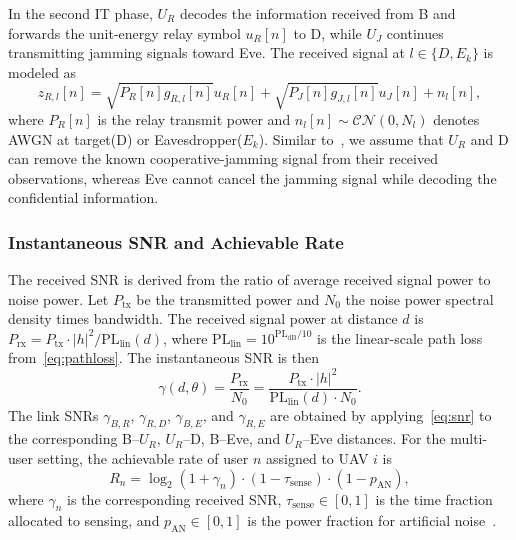 \documentclass[journal]{IEEEtran}
\begin{document}
In the second IT phase, $U_R$ decodes the information received from B and forwards the unit-energy relay symbol $u_R[n]$ to D, while $U_J$ continues transmitting jamming signals toward Eve. The received signal at $l\in\{D,E_k\}$ is modeled as~\cite{pandeydualuav2026}
\begin{equation}
z_{R,l}[n]=\sqrt{P_R[n]g_{R,l}[n]}u_R[n]+\sqrt{P_J[n]g_{J,l}[n]}u_J[n]+n_l[n],
\label{eq:rx_phase2}
\end{equation}
where $P_R[n]$ is the relay transmit power and $n_l[n]\sim\mathcal{CN}(0,N_l)$ denotes AWGN at target(D) or Eavesdropper($E_k$). Similar to~\cite{pandeydualuav2026}, we assume that $U_R$ and D can remove the known cooperative-jamming signal from their received observations, whereas Eve cannot cancel the jamming signal while decoding the confidential information.

\subsubsection{Instantaneous SNR and Achievable Rate}
The received SNR is derived from the ratio of average received signal power to noise power. Let $P_{\text{tx}}$ be the transmitted power and $N_0$ the noise power spectral density times bandwidth. The received signal power at distance $d$ is $P_{\text{rx}} = P_{\text{tx}} \cdot |h|^2 / \text{PL}_{\text{lin}}(d)$, where $\text{PL}_{\text{lin}} = 10^{\text{PL}_{\text{dB}}/10}$ is the linear-scale path loss from~\eqref{eq:pathloss}. The instantaneous SNR is then~\cite{pandeyiot2023, pandeyrfehiot2025}
\begin{equation}
\gamma(d, \theta) = \frac{P_{\text{rx}}}{N_0} = \frac{P_{\text{tx}} \cdot |h|^2}{\text{PL}_{\text{lin}}(d) \cdot N_0}.
\label{eq:snr}
\end{equation}
The link SNRs $\gamma_{B,R}$, $\gamma_{R,D}$, $\gamma_{B,E}$, and $\gamma_{R,E}$ are obtained by applying~\eqref{eq:snr} to the corresponding B--$U_R$, $U_R$--D, B--Eve, and $U_R$--Eve distances. For the multi-user setting, the achievable rate of user $n$ assigned to UAV $i$ is
\begin{equation}
R_n = \log_2(1 + \gamma_n) \cdot (1 - \tau_{\text{sense}}) \cdot (1 - p_{\text{AN}}),
\label{eq:rate}
\end{equation}
where $\gamma_n$ is the corresponding received SNR, $\tau_{\text{sense}} \in [0,1]$ is the time fraction allocated to sensing, and $p_{\text{AN}} \in [0,1]$ is the power fraction for artificial noise~\cite{pandeyswiptjam2025}.
\end{document}
